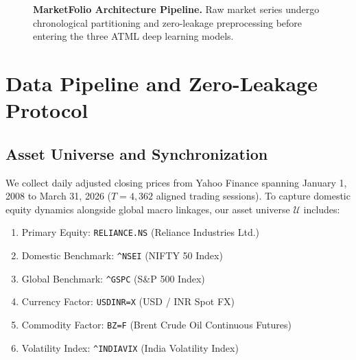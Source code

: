 \documentclass[10pt,twocolumn,letterpaper]{article}
\begin{document}
\begin{figure}[t]
\caption{\textbf{MarketFolio Architecture Pipeline.} Raw market series undergo chronological partitioning and zero-leakage preprocessing before entering the three ATML deep learning models.}
\label{fig:pipeline}
\end{figure}

\section{Data Pipeline and Zero-Leakage Protocol}

\subsection{Asset Universe and Synchronization}
We collect daily adjusted closing prices from Yahoo Finance spanning January 1, 2008 to March 31, 2026 ($T = 4,362$ aligned trading sessions). To capture domestic equity dynamics alongside global macro linkages, our asset universe $\mathcal{U}$ includes:
\begin{enumerate}[leftmargin=*]
    \item Primary Equity: \texttt{RELIANCE.NS} (Reliance Industries Ltd.)
    \item Domestic Benchmark: \texttt{\textasciicircum NSEI} (NIFTY 50 Index)
    \item Global Benchmark: \texttt{\textasciicircum GSPC} (S\&P 500 Index)
    \item Currency Factor: \texttt{USDINR=X} (USD / INR Spot FX)
    \item Commodity Factor: \texttt{BZ=F} (Brent Crude Oil Continuous Futures)
    \item Volatility Index: \texttt{\textasciicircum INDIAVIX} (India Volatility Index)
\end{enumerate}
\end{document}
